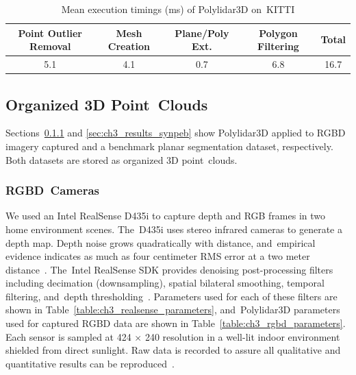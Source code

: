 \begin{table}[H]
\centering
\caption{Mean execution timings (ms) of Polylidar3D on~KITTI}
\label{table:ch3_kitti_timings}
\begin{tabular}{@{}ccccc@{}}
\toprule
\textbf{Point Outlier Removal} &\textbf{ Mesh Creation} & \textbf{Plane/Poly Ext.}  & \textbf{Polygon Filtering} & \textbf{Total}   \\ \midrule
5.1           &    4.1             & 0.7             & 6.8                 & 16.7 \\ \bottomrule
\end{tabular}
\end{table}
\unskip

\subsection{Organized 3D Point~Clouds}\label{sec:ch3_results_orgnaized}

Sections~\ref{sec:ch3_results_rgbd} and \ref{sec:ch3_results_synpeb} show Polylidar3D applied to \ac{RGBD} imagery captured and a benchmark planar segmentation dataset, respectively.  Both datasets are stored as organized 3D point~clouds.

\subsubsection{RGBD~Cameras}\label{sec:ch3_results_rgbd} %

We used an Intel RealSense D435i to capture depth and RGB frames in two home environment scenes. The~D435i uses stereo infrared cameras to generate a depth map.  Depth noise grows quadratically with distance, and~empirical evidence indicates as much as four centimeter RMS error at a two meter distance~\cite{ahn_analysis_2019}. The~Intel RealSense SDK provides denoising post-processing filters including decimation (downsampling), spatial bilateral smoothing, temporal filtering, and~depth thresholding~\cite{noauthor_github_2019-1}. Parameters used for each of these filters are shown in Table~\ref{table:ch3_realsense_parameters}, and~Polylidar3D parameters used for captured \ac{RGBD} data are shown in Table~\ref{table:ch3_rgbd_parameters}. Each sensor is sampled at 424 $\times$ 240 resolution in a well-lit indoor environment shielded from direct sunlight. Raw data is recorded to assure all qualitative and quantitative results can be reproduced~\cite{Castagno_Github_Polylidar3D_RealSense}.  


